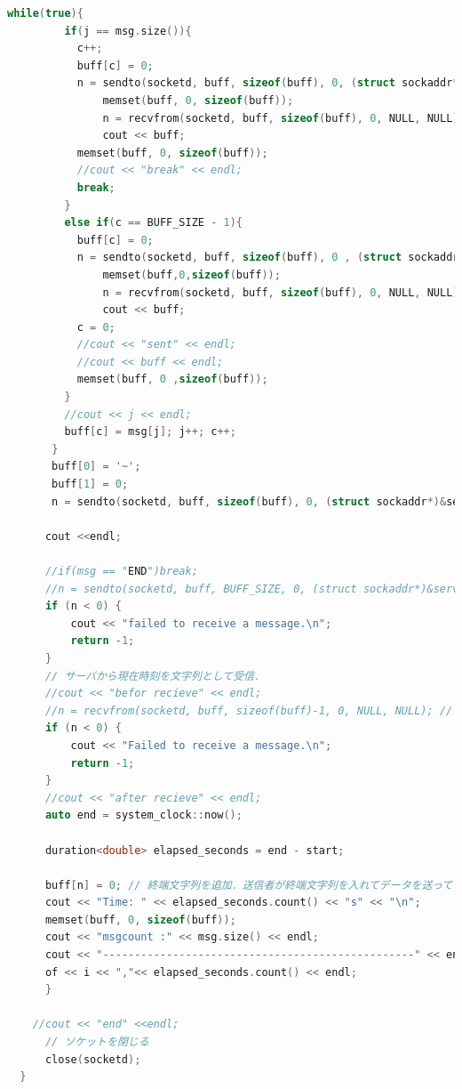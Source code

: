 \documentclass[fleqn, a4paper. 12pt]{ltjsarticle}
\begin{document}
\begin{lstlisting}[language=C++]
       while(true){
         if(j == msg.size()){
           c++;
           buff[c] = 0;
           n = sendto(socketd, buff, sizeof(buff), 0, (struct sockaddr*)&serv_addr, sizeof(serv_addr));
               memset(buff, 0, sizeof(buff));
               n = recvfrom(socketd, buff, sizeof(buff), 0, NULL, NULL);
               cout << buff;
           memset(buff, 0, sizeof(buff));
           //cout << "break" << endl;
           break;
         }
         else if(c == BUFF_SIZE - 1){
           buff[c] = 0;
           n = sendto(socketd, buff, sizeof(buff), 0 , (struct sockaddr*)&serv_addr, sizeof(serv_addr));
               memset(buff,0,sizeof(buff));
               n = recvfrom(socketd, buff, sizeof(buff), 0, NULL, NULL);
               cout << buff;
           c = 0;
           //cout << "sent" << endl;
           //cout << buff << endl;
           memset(buff, 0 ,sizeof(buff));
         }
         //cout << j << endl;
         buff[c] = msg[j]; j++; c++;
       }
       buff[0] = '~';
       buff[1] = 0;
       n = sendto(socketd, buff, sizeof(buff), 0, (struct sockaddr*)&serv_addr, sizeof(serv_addr));
  
      cout <<endl;
  
      //if(msg == "END")break;
      //n = sendto(socketd, buff, BUFF_SIZE, 0, (struct sockaddr*)&serv_addr, sizeof(serv_addr));
      if (n < 0) {
          cout << "failed to receive a message.\n";
          return -1;
      }
      // サーバから現在時刻を文字列として受信．
      //cout << "befor recieve" << endl;
      //n = recvfrom(socketd, buff, sizeof(buff)-1, 0, NULL, NULL); // 終端文字列を入れるために，sizeof(buff)-1 として，文字列一つ分必ず余裕を持たせてデータを受信する．buff をこのまま文字列として使わない場合は全記憶を受信に使う．
      if (n < 0) {
          cout << "Failed to receive a message.\n";
          return -1;
      }
      //cout << "after recieve" << endl;
      auto end = system_clock::now();
  
      duration<double> elapsed_seconds = end - start;
  
      buff[n] = 0; // 終端文字列を追加．送信者が終端文字列を入れてデータを送ってきているとは限らない．
      cout << "Time: " << elapsed_seconds.count() << "s" << "\n";
      memset(buff, 0, sizeof(buff));
      cout << "msgcount :" << msg.size() << endl;
      cout << "-------------------------------------------------" << endl;
      of << i << ","<< elapsed_seconds.count() << endl;
      }
      
    //cout << "end" <<endl;
      // ソケットを閉じる
      close(socketd);
  }
\end{lstlisting}
\end{document}
